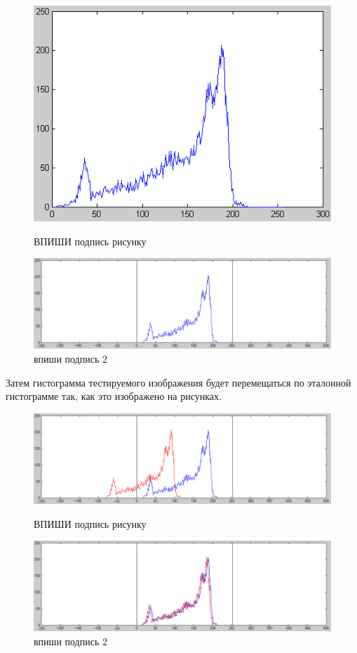 \documentclass[a4paper,12pt,titlpage]{posobie}
\begin{document}
\begin{figure}[h]
  \includegraphics[width=\textwidth]{method_pics/orig.png}
  \caption{ВПИШИ подпись рисунку}
  \includegraphics[width=\textwidth]{method_pics/wide.png}
  \caption{впиши подпись 2}
\end{figure}

Затем гистограмма тестируемого изображения будет перемещаться по эталонной гистограмме так, как это изображено на рисунках.

\begin{figure}[h]
  \includegraphics[width=\textwidth]{method_pics/wide+.png}
  \caption{ВПИШИ подпись рисунку}
  \includegraphics[width=\textwidth]{method_pics/wide++.png}
  \caption{впиши подпись 2}
\end{figure}
\end{document}
